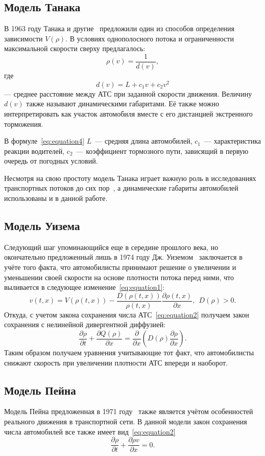 \subsection{Модель Танака}\label{subsec:ch1/sec1/sub2}
В 1963 году Танака и другие~\cite{inose1983control} предложили один из способов определения зависимости \( V(\rho) \).
В условиях однополосного потока и ограниченности максимальной скорости сверху предлагалось:
\[
\rho(v) = \frac{1}{d(v)},
\]
где 
\begin{equation}
    \label{eq:equation4}
    d(v) = L + c_1v + c_2v^2
\end{equation}
--- среднее расстояние между АТС при заданной скорости движения. 
Величину $d(v)$ также называют динамическими габаритами.
Её также можно интерпретировать как участок автомобиля вместе с его дистанцией экстренного торможения.

В формуле~\cref{eq:equation4} \(L\)~--- средняя длина автомобилей, \(c_1\)~--- характеристика реакции водителей, \(c_2\)~--- коэффициент тормозного пути, зависящий в первую очередь от погодных условий.

Несмотря на свою простоту модель Танака играет важную роль в исследованиях транспортных потоков до сих пор~\cite{gartner2002traffic}, а динамические габариты автомобилей использованы и в данной работе.

\subsection{Модель Уизема}\label{subsec:ch1/sec1/sub3}
Следующий шаг упоминающийся еще в середине прошлого века, но окончательно предложенный лишь в 1974 году Дж. Уиземом~\cite{uisem1977linear} заключается в учёте того факта, что автомобилисты принимают решение о увеличении и уменьшении своей скорости на основе плотности потока перед ними, что выливается в следующее изменение~\ref{eq:equation1}:
\[
    v(t, x) = V(\rho(t, x)) - \frac{D(\rho(t, x))}{\rho(t,x)}\frac{\partial\rho(t,x)}{\partial x},\ \ D(\rho) > 0.
\]
Откуда, с учетом закона сохранения числа АТС~\ref{eq:equation2} получаем закон сохранения с нелинейной дивергентной диффузией:
\[
    \frac{\partial \rho}{\partial t} + \frac{\partial Q(\rho)}{\partial x} = \frac{\partial}{\partial x} \left(D(\rho) \frac{\partial \rho}{\partial x}\right).
\]
Таким образом получаем уравнения учитывающие тот факт, что автомобилисты снижают скорость при увеличении плотности АТС впереди и наоборот.


\subsection{Модель Пейна}\label{subsec:ch1/sec1/sub4}
Модель Пейна предложенная в 1971 году~\cite{payne1971model} также является учётом особенностей реального движения в транспортной сети.
В данной модели закон сохранения числа автомобилей все также имеет вид~\cref{eq:equation2}
\[
    \frac{\partial \rho}{\partial t} + \frac{\partial \rho v}{\partial x} = 0.
\]

